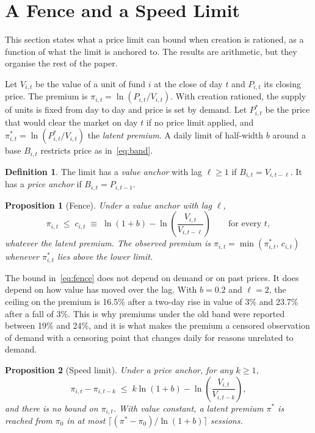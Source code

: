 \documentclass[10pt,journal,a4paper]{IEEEtran}
\newtheorem{proposition}{Proposition}
\theoremstyle{definition}
\newtheorem{definition}{Definition}
\begin{document}
\section{A Fence and a Speed Limit}\label{sec:framework}
This section states what a price limit can bound when creation is rationed, as a function of what the limit is anchored to. The results are arithmetic, but they organise the rest of the paper.

Let $V_{i,t}$ be the value of a unit of fund $i$ at the close of day $t$ and $P_{i,t}$ its closing price. The premium is $\pi_{i,t}=\ln(P_{i,t}/V_{i,t})$. With creation rationed, the supply of units is fixed from day to day and price is set by demand. Let $P^{*}_{i,t}$ be the price that would clear the market on day $t$ if no price limit applied, and $\pi^{*}_{i,t}=\ln(P^{*}_{i,t}/V_{i,t})$ the \emph{latent premium}. A daily limit of half-width $b$ around a base $B_{i,t}$ restricts price as in~\eqref{eq:band}.

\begin{definition}
The limit has a \emph{value anchor} with lag $\ell\ge 1$ if $B_{i,t}=V_{i,t-\ell}$. It has a \emph{price anchor} if $B_{i,t}=P_{i,t-1}$.
\end{definition}

\begin{proposition}[Fence]\label{prop:fence}
Under a value anchor with lag $\ell$,
\begin{equation}\label{eq:fence}
\pi_{i,t}\;\le\;c_{i,t}\;\equiv\;\ln(1+b)-\ln\!\left(\frac{V_{i,t}}{V_{i,t-\ell}}\right)\qquad\text{for every } t,
\end{equation}
whatever the latent premium. The observed premium is $\pi_{i,t}=\min(\pi^{*}_{i,t},\,c_{i,t})$ whenever $\pi^{*}_{i,t}$ lies above the lower limit.
\end{proposition}

The bound in~\eqref{eq:fence} does not depend on demand or on past prices. It does depend on how value has moved over the lag. With $b=0.2$ and $\ell=2$, the ceiling on the premium is 16.5\% after a two-day rise in value of 3\% and 23.7\% after a fall of 3\%. This is why premiums under the old band were reported between 19\% and 24\%, and it is what makes the premium a censored observation of demand with a censoring point that changes daily for reasons unrelated to demand.

\begin{proposition}[Speed limit]\label{prop:speed}
Under a price anchor, for any $k\ge 1$,
\begin{equation}\label{eq:speed}
\pi_{i,t}-\pi_{i,t-k}\;\le\;k\ln(1+b)-\ln\!\left(\frac{V_{i,t}}{V_{i,t-k}}\right),
\end{equation}
and there is no bound on $\pi_{i,t}$. With value constant, a latent premium $\pi^{*}$ is reached from $\pi_{0}$ in at most $\lceil(\pi^{*}-\pi_{0})/\ln(1+b)\rceil$ sessions.
\end{proposition}
\end{document}
